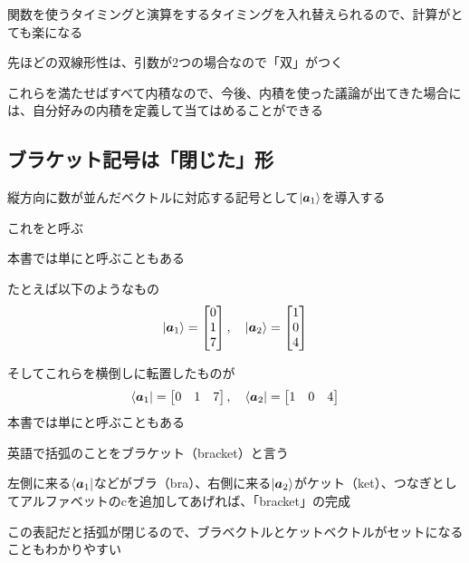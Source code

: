 \documentclass[../book_half_step_linear]{subfiles}
\begin{document}
関数を使うタイミングと演算をするタイミングを入れ替えられるので、計算がとても楽になる

\br

先ほどの双線形性は、引数が2つの場合なので「双」がつく

\sectionline

これらを満たせばすべて内積なので、今後、内積を使った議論が出てきた場合には、自分好みの内積を定義して当てはめることができる

\sectionline
\subsection{ブラケット記号は「閉じた」形}

縦方向に数が並んだベクトルに対応する記号として$\Ket{\vb*{a}_1}$を導入する

これをと呼ぶ

本書では単にと呼ぶこともある

たとえば以下のようなもの
\begin{equation*}
  \Ket{\vb*{a}_1} = \begin{bmatrix} 0 \\ 1 \\ 7 \end{bmatrix}, \quad \Ket{\vb*{a}_2} = \begin{bmatrix} 1 \\ 0 \\ 4 \end{bmatrix}
\end{equation*}

そしてこれらを横倒しに転置したものが
\begin{equation*}
  \Bra{\vb*{a}_1} = \begin{bmatrix} 0 & 1 & 7 \end{bmatrix}, \quad \Bra{\vb*{a}_2} = \begin{bmatrix} 1 & 0 & 4 \end{bmatrix}
\end{equation*}
本書では単にと呼ぶこともある

\br

英語で括弧のことをブラケット（bracket）と言う

左側に来る$\Bra{\vb*{a}_1}$などがブラ（bra）、右側に来る$\Ket{\vb*{a}_2}$がケット（ket）、つなぎとしてアルファベットのcを追加してあげれば、「bracket」の完成

\br

この表記だと括弧が閉じるので、ブラベクトルとケットベクトルがセットになることもわかりやすい
\end{document}

